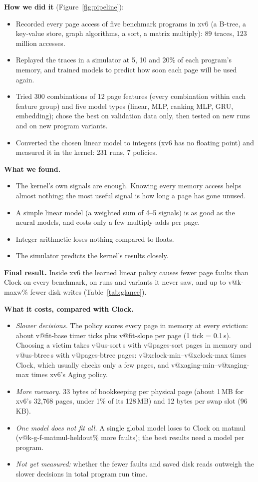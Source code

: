 \documentclass[10.5pt,a4paper]{article}
\makeatletter
\newcommand{\val}[1]{\csname v@#1\endcsname}
\makeatother
\begin{document}
\textbf{How we did it} (Figure~\ref{fig:pipeline}):
\begin{itemize}
\item Recorded every page access of five benchmark programs in xv6 (a B-tree,
a key-value store, graph algorithms, a sort, a matrix multiply): 89 traces,
123 million accesses.
\item Replayed the traces in a simulator at 5, 10 and 20\% of each program's
memory, and trained models to predict how soon each page will be used again.
\item Tried 300 combinations of 12 page features (every combination within
each feature group) and five model types (linear, MLP, ranking MLP, GRU,
embedding); chose the best on validation data only, then tested on new runs
and on new program variants.
\item Converted the chosen linear model to integers (xv6 has no floating point)
and measured it in the kernel: 231 runs, 7 policies.
\end{itemize}

\textbf{What we found.}
\begin{itemize}
\item The kernel's own signals are enough. Knowing every memory access helps
almost nothing; the most useful signal is how long a page has gone unused.
\item A simple linear model (a weighted sum of 4--5 signals) is as good as the
neural models, and costs only a few multiply-adds per page.
\item Integer arithmetic loses nothing compared to floats.
\item The simulator predicts the kernel's results closely.
\end{itemize}

\textbf{Final result.} Inside xv6 the learned linear policy causes fewer page
faults than Clock on every benchmark, on runs and variants it never saw, and
up to \val{k-maxw}\% fewer disk writes (Table~\ref{tab:glance}).

\textbf{What it costs, compared with Clock.}
\begin{itemize}
\item \emph{Slower decisions.} The policy scores every page in memory at every
eviction: about \val{fit-base} timer ticks plus \val{fit-slope} per page (1 tick = 0.1\,\textmu s).
Choosing a victim takes \val{us-sort}\,\textmu s with \val{pages-sort} pages in memory and \val{us-btree}\,\textmu s
with \val{pages-btree} pages: \val{xclock-min}--\val{xclock-max} times Clock, which usually checks only a
few pages, and \val{xaging-min}--\val{xaging-max} times xv6's Aging policy.
\item \emph{More memory.} 33 bytes of bookkeeping per physical page (about
1\,MB for xv6's 32,768 pages, under 1\% of its 128\,MB) and 12 bytes per swap
slot (96\,KB).
\item \emph{One model does not fit all.} A single global model loses to Clock
on matmul (\val{k-g-f-matmul-heldout}\% more faults); the best results need a model per program.
\item \emph{Not yet measured:} whether the fewer faults and saved disk reads
outweigh the slower decisions in total program run time.
\end{itemize}
\end{document}

